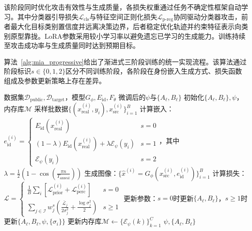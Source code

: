 该阶段同时优化攻击有效性与生成质量，各损失权重通过任务不确定性框架自动学习。其中分类器引导损失$\mathcal{L}_{\text{cls}}$与特征空间正则化损失$\mathcal{L}_{\text{p-reg}}$协同驱动分类器攻击，前者最大化目标类别置信度并远离决策边界，后者稳定优化轨迹并约束特征表示向类别原型靠拢。LoRA参数采用较小学习率以避免遗忘已学习的生成能力。训练持续至攻击成功率与生成质量同时达到预期目标。

算法~\ref{alg:mia_progressive}给出了渐进式三阶段训练的统一实现流程。该算法通过阶段标识$s\in\{0,1,2\}$区分不同训练阶段，各阶段在身份嵌入生成方式、损失函数组成及参数更新策略上存在差异。

\begin{algorithm}[!t]
  \caption{渐进式三阶段SwapMIA训练算法}
  \label{alg:mia_progressive}
  \begin{algorithmic}[1]
    \REQUIRE 数据集$\mathcal{D}_{\text{public}}, \mathcal{D}_{\text{target}}$，模型$G_\phi, E_{\text{id}}, F_\theta$
    \ENSURE 微调后的$\psi$与$\{A_\ell, B_\ell\}$
    \STATE 初始化$\{A_\ell, B_\ell\}, \psi$，内存库$\mathcal{M}$
    \STATE 采样批数据$\{(x_{\text{real}}^{(i)}, y_i), x_{\text{src}}^{(i)}\}_{i=1}^B$
    \STATE 计算嵌入：$e_{\text{id}}^{(i)} = \begin{cases} E_{\text{id}}(x_{\text{real}}^{(i)}) & s=0 \\ (1-\lambda) E_{\text{id}}(x_{\text{real}}^{(i)}) + \lambda \mathcal{E}_\psi(y_i) & s=1 \\ \mathcal{E}_\psi(y_i) & s=2 \end{cases}$，其中$\lambda = \frac{1}{2}(1-\cos(\frac{\pi n}{T_{\text{anneal}}}))$
    \STATE 生成图像：$\{\hat{x}^{(i)} = G_\phi(x_{\text{src}}^{(i)}, e_{\text{id}}^{(i)})\}_{i=1}^B$
    \STATE 计算损失：$\mathcal{L} = \begin{cases} \frac{1}{B}\sum_i [\mathcal{L}_{\text{prior}}^{(i)} + \mathcal{L}_{\text{perc}}^{(i)}] & s=0 \\ \sum_{j\in\mathcal{I}} w_j^s(\frac{\bar{\mathcal{L}}_j}{2\sigma_j^2} + \frac{\log\sigma_j^2}{2}) & s\geq1 \end{cases}$
    \STATE 更新参数：$s=0$时更新$\{A_\ell, B_\ell\}$，$s\geq1$时更新$\{A_\ell, B_\ell, \psi, \{\sigma_i\}\}$
    \STATE 更新内存库$\mathcal{M} \leftarrow \{\mathcal{E}_\psi(k)\}_{k=1}^C$
    \ENDIF
    \ENDFOR
    \ENDFOR
    \RETURN $\psi, \{A_\ell, B_\ell\}$
  \end{algorithmic}
\end{algorithm}

